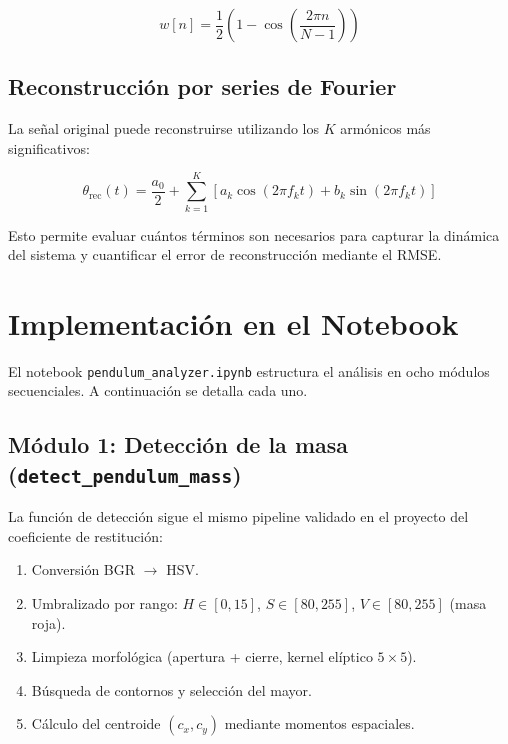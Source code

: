 \documentclass[12pt,a4paper]{article}
\begin{document}
\begin{equation}
    w[n] = \frac{1}{2}\left(1 - \cos\!\left(\frac{2\pi n}{N-1}\right)\right)
\end{equation}

\subsection{Reconstrucción por series de Fourier}

La señal original puede reconstruirse utilizando los $K$ armónicos más significativos:

\begin{equation}
    \theta_{\text{rec}}(t) = \frac{a_0}{2} + \sum_{k=1}^{K} \left[ a_k \cos(2\pi f_k t) + b_k \sin(2\pi f_k t) \right]
\end{equation}

Esto permite evaluar cuántos términos son necesarios para capturar la dinámica del sistema y cuantificar el error de reconstrucción mediante el RMSE.

\section{Implementación en el Notebook}

El notebook \texttt{pendulum\_analyzer.ipynb} estructura el análisis en ocho módulos secuenciales. A continuación se detalla cada uno.

\subsection{Módulo 1: Detección de la masa (\texttt{detect\_pendulum\_mass})}

La función de detección sigue el mismo pipeline validado en el proyecto del coeficiente de restitución:

\begin{enumerate}
    \item Conversión BGR $\rightarrow$ HSV.
    \item Umbralizado por rango: $H \in [0, 15]$, $S \in [80, 255]$, $V \in [80, 255]$ (masa roja).
    \item Limpieza morfológica (apertura + cierre, kernel elíptico $5 \times 5$).
    \item Búsqueda de contornos y selección del mayor.
    \item Cálculo del centroide $(c_x, c_y)$ mediante momentos espaciales.
\end{enumerate}
\end{document}
